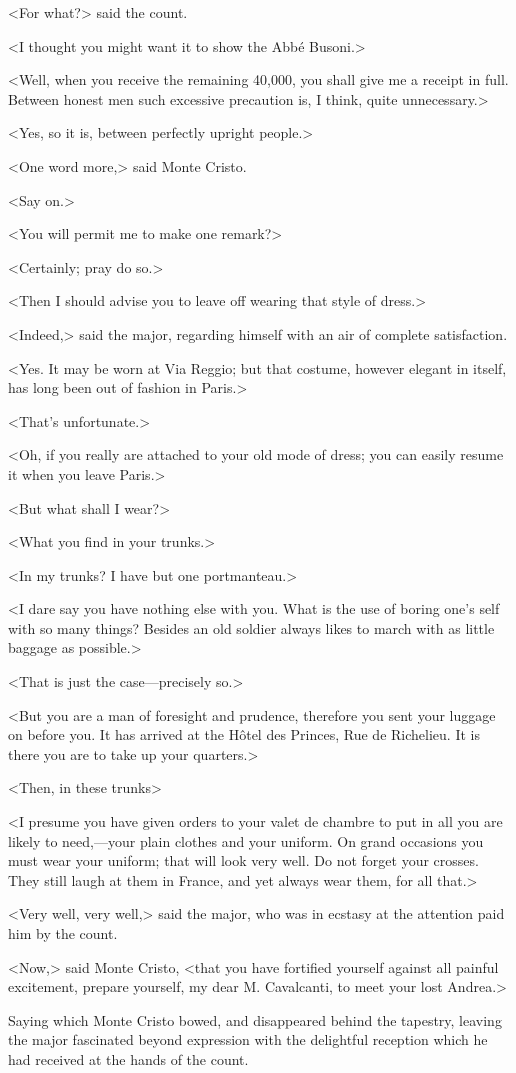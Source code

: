  <For what?> said the count. 

 <I thought you might want it to show the Abbé Busoni.> 

 <Well, when you receive the remaining 40,000, you shall give me a receipt in full. Between honest men such excessive precaution is, I think, quite unnecessary.> 

 <Yes, so it is, between perfectly upright people.> 

 <One word more,> said Monte Cristo. 

 <Say on.> 

 <You will permit me to make one remark?> 

 <Certainly; pray do so.> 

 <Then I should advise you to leave off wearing that style of dress.> 

 <Indeed,> said the major, regarding himself with an air of complete satisfaction. 

 <Yes. It may be worn at Via Reggio; but that costume, however elegant in itself, has long been out of fashion in Paris.> 

 <That's unfortunate.> 

 <Oh, if you really are attached to your old mode of dress; you can easily resume it when you leave Paris.> 

 <But what shall I wear?> 

 <What you find in your trunks.> 

 <In my trunks? I have but one portmanteau.> 

 <I dare say you have nothing else with you. What is the use of boring one's self with so many things? Besides an old soldier always likes to march with as little baggage as possible.> 

 <That is just the case—precisely so.> 

 <But you are a man of foresight and prudence, therefore you sent your luggage on before you. It has arrived at the Hôtel des Princes, Rue de Richelieu. It is there you are to take up your quarters.> 

 <Then, in these trunks\longdash> 

 <I presume you have given orders to your valet de chambre to put in all you are likely to need,—your plain clothes and your uniform. On grand occasions you must wear your uniform; that will look very well. Do not forget your crosses. They still laugh at them in France, and yet always wear them, for all that.> 

 <Very well, very well,> said the major, who was in ecstasy at the attention paid him by the count. 

 <Now,> said Monte Cristo, <that you have fortified yourself against all painful excitement, prepare yourself, my dear M. Cavalcanti, to meet your lost Andrea.> 

 Saying which Monte Cristo bowed, and disappeared behind the tapestry, leaving the major fascinated beyond expression with the delightful reception which he had received at the hands of the count. 